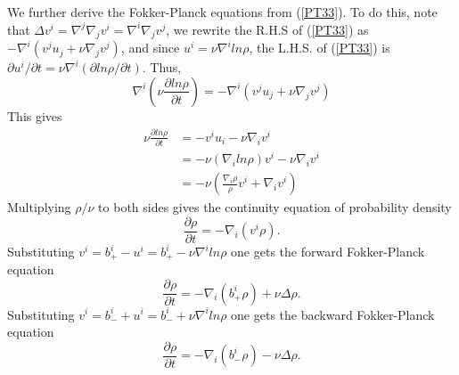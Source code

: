 \documentclass[%
 aip, 
 amsmath,amssymb,amsthm,
 nofootinbib,
 reprint,
]{revtex4-1}
\begin{document}
We further derive the Fokker-Planck equations from (\ref{PT33}). To do this, note that $\Delta v^i = \nabla^j\nabla_j v^i = \nabla^i\nabla_j v^j$, we rewrite the R.H.S of (\ref{PT33}) as $-\nabla^i(v^ju_j + \nu\nabla_jv^j)$, and since $u^i=\nu\nabla^i ln\rho$, the L.H.S. of (\ref{PT33}) is $\partial u^i/\partial t = \nu\nabla^i (\partial ln\rho/\partial t)$. Thus,
\begin{equation}
    \label{PT34}
    \nabla^i(\nu\frac{\partial ln\rho}{\partial t})= -\nabla^i(v^ju_j + \nu\nabla_jv^j) 
\end{equation}
This gives
\begin{equation}
    \label{PT35}
    \begin{split}
    \nu\frac{\partial ln\rho}{\partial t}&= -v^iu_i - \nu\nabla_iv^i \\
    &= -\nu(\nabla_iln\rho)v^i - \nu\nabla_iv^i\\
    &= -\nu(\frac{\nabla_i\rho}{\rho}v^i + \nabla_iv^i)
    \end{split}
\end{equation}
Multiplying $\rho/\nu$ to both sides gives the continuity equation of probability density
\begin{equation}
    \label{PT36}
    \frac{\partial \rho}{\partial t} = -\nabla_i(v^i\rho).
\end{equation}
Substituting $v^i = b_+^i - u^i = b_+^i - \nu\nabla^iln\rho$ one gets the forward Fokker-Planck equation
\begin{equation}
    \label{PT37}
    \frac{\partial \rho}{\partial t} = -\nabla_i(b_+^i\rho) + \nu\Delta\rho.
\end{equation}
Substituting $v^i = b_-^i + u^i = b_-^i + \nu\nabla^iln\rho$ one gets the backward Fokker-Planck equation
\begin{equation}
    \label{PT38}
    \frac{\partial \rho}{\partial t} = -\nabla_i(b_-^i\rho) - \nu\Delta\rho.
\end{equation}
\end{document}
